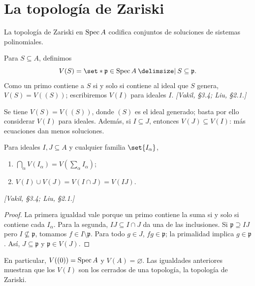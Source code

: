 
\section{La topología de Zariski}

La topología de Zariski en $\operatorname{Spec} A$ codifica conjuntos de soluciones de sistemas polinomiales.

\begin{defi}
\label{defi:s02-s-definimos-v-s-p}
Para $S\subseteq A$, definimos
\[
V(S)=\set*{\mathfrak p\in\Spec A \given S\subseteq\mathfrak p}.
\]
Como un primo contiene a $S$ si y solo si contiene al ideal que $S$ genera, $V(S)=V((S))$; escribiremos $V(I)$ para ideales $I$. \emph{[Vakil, \S3.4; Liu, \S2.1.]}
\end{defi}

\begin{obs}
\label{obs:s02-tiene-v-s-v-s}
Se tiene $V(S)=V((S))$, donde $(S)$ es el ideal generado; basta por ello considerar $V(I)$ para ideales. Además, si $I\subseteq J$, entonces $V(J)\subseteq V(I)$: más ecuaciones dan menos soluciones.
\end{obs}

\begin{prop}
\label{prop:s02-ideales-i-j-cualquier-familia}
Para ideales $I,J\subseteq A$ y cualquier familia $\set{I_\alpha}$,
\begin{enumerate}
\item $\displaystyle\bigcap_\alpha V(I_\alpha)=V\left(\sum_\alpha I_\alpha\right)$;
\item $V(I)\cup V(J)=V(I\cap J)=V(IJ)$.
\end{enumerate}
\emph{[Vakil, \S3.4; Liu, \S2.1.]}
\end{prop}
\begin{proof}
La primera igualdad vale porque un primo contiene la suma si y solo si contiene cada $I_\alpha$. Para la segunda, $IJ\subseteq I\cap J$ da una de las inclusiones. Si $\mathfrak p\supseteq IJ$ pero $I\not\subseteq\mathfrak p$, tomamos $f\in I\setminus\mathfrak p$. Para todo $g\in J$, $fg\in\mathfrak p$; la primalidad implica $g\in\mathfrak p$. Así, $J\subseteq\mathfrak p$ y $\mathfrak p\in V(J)$.
\end{proof}

En particular, $V((0))=\operatorname{Spec} A$ y $V(A)=\varnothing$. Las igualdades anteriores muestran que los $V(I)$ son los cerrados de una topología, la topología de Zariski.

